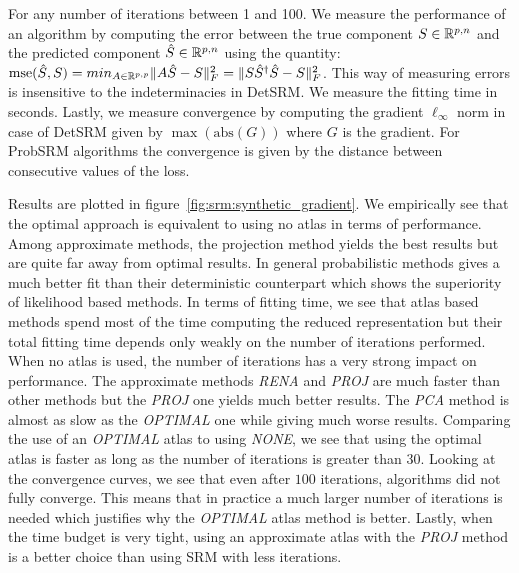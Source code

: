 For any number of iterations between 1 and 100.
We measure the performance of an algorithm by computing the error between the true component $S \in \mathbb{R}^{p, n}$ and
the predicted component $\hat{S} \in \mathbb{R}^{p, n}$ using the quantity:
$\mathrm{mse}(\hat{S}, S) = min_{A \in \mathbb{R}^{p, p}} \|A \hat{S} - S \|^2_F =  \|S
\hat{S}^{\dagger}\hat{S} - S \|^2_F$. This way of measuring errors is
insensitive to the indeterminacies in DetSRM.
We measure the fitting time in seconds.
Lastly, we measure convergence by computing the gradient $\ell_{\infty}$ norm in
case of DetSRM given by $\max(\mathrm{abs}(G))$ where $G$ is the gradient. For ProbSRM
algorithms the convergence is given by the distance between consecutive values of the loss.

Results are plotted in figure~\ref{fig:srm:synthetic_gradient}. 
We empirically see that the optimal approach is equivalent to using no atlas in
terms of performance. Among approximate methods, the projection
method yields the best results but are quite far away from optimal results.
In general probabilistic methods gives a much better fit than their deterministic
counterpart which shows the superiority of likelihood based methods.
In terms of fitting time, we see that atlas based methods spend most of the time
computing the reduced representation but their total fitting time depends only
weakly on the number of iterations performed. When no atlas is used, the number
of iterations has a very strong impact on performance. The approximate methods
\emph{RENA} and \emph{PROJ} are much faster than other methods but
the \emph{PROJ} one yields much better results. The \emph{PCA} method is
almost as slow as the \emph{OPTIMAL} one while giving much worse results.
Comparing the use of an \emph{OPTIMAL} atlas to using \emph{NONE}, we see that
using the optimal atlas is faster as long as the number of iterations is greater
than $30$.
Looking at the convergence curves, we see that even after $100$ iterations, algorithms did
not fully converge. This means that in practice a much larger number of
iterations is needed which justifies why the \emph{OPTIMAL} atlas method is better.
Lastly, when the time budget is very tight, using an approximate atlas with the
\emph{PROJ} method is a better choice than
using SRM with less iterations. 

